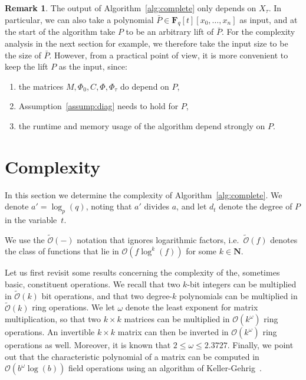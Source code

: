 \documentclass[a4paper,11pt]{article}
\numberwithin{equation}{section}
\newcommand{\NN}{\mathbf{N}} %
\newcommand{\FF}{\mathbf{F}} %
\providecommand{\BigOh}{\mathcal{O}}          %
\providecommand{\SoftOh}{\tilde{\mathcal{O}}} %
\theoremstyle{definition}
\newtheorem{rem}[thm]{Remark}
\begin{document}
\begin{rem}
The output of Algorithm~\ref{alg:complete} only depends on $X_{\tau}$. In particular, 
we can also take a polynomial $\bar{P} \in \FF_q[t][x_0,\dotsc,x_n]$ as input, and at the 
start of the algorithm take $P$ to be an arbitrary lift of $\bar{P}$. For the complexity 
analysis in the next section for example, we therefore take the input size to be the size 
of $\bar{P}$.  However, from a practical point of view, it is more convenient to keep the 
lift $P$ as the input, since:
\begin{enumerate} 
\item the matrices $M, \Phi_0, C, \Phi, \Phi_{\tau}$ do depend on $P$, 
\item Assumption~\ref{assump:diag} needs to hold for $P$,
\item the runtime and memory usage of the algorithm depend strongly on $P$. 
\end{enumerate}
\end{rem}


\section{Complexity}

\label{sec:Complexity}

In this section we determine the complexity of Algorithm~\ref{alg:complete}.
We denote $a' = \log_p(q)$, noting that $a'$ divides $a$, 
and let $d_t$ denote the degree of $P$ in the variable~$t$. 

We use the $\SoftOh(-)$ notation that ignores logarithmic factors, 
i.e.\ $\SoftOh(f)$ denotes the class of functions 
that lie in $\BigOh(f \log^k(f))$ for some $k \in \NN$.

Let us first revisit some results concerning the complexity of the, 
sometimes basic, constituent operations.  We recall that two $k$-bit 
integers can be multiplied in $\SoftOh(k)$ bit operations, and that 
two degree-$k$ polynomials can be multiplied in $\SoftOh(k)$ ring 
operations.  We let $\omega$ denote the least exponent for matrix 
multiplication, so that two $k \times k$ matrices can be multiplied 
in $\BigOh(k^{\omega})$ ring operations. An invertible $k \times k$ matrix 
can then be inverted in $\BigOh(k^{\omega})$ ring operations as well. 
Moreover, it is known that $2 \leq \omega \leq 2.3727$.  Finally, we 
point out that the characteristic polynomial of a matrix can be 
computed in $\BigOh(b^{\omega} \log(b))$ field operations using 
an algorithm of Keller-Gehrig~\citep{KellerGehrig1985}.
\end{document}
